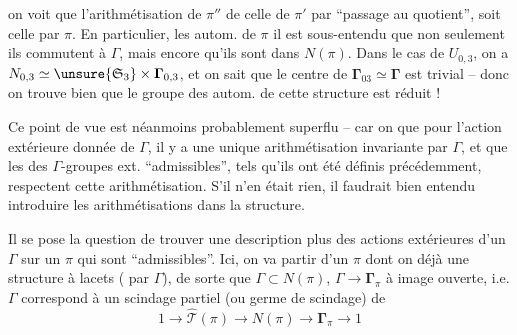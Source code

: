 on voit que l'arithmétisation de $\pi''$  de celle de $\pi'$ par ``passage au quotient'', soit celle  par $\pi$.  En particulier,  les autom. de $\pi$ il est sous-entendu que  non seulement ils commutent à $\Gamma$, mais encore qu'ils sont dans $N(\pi)$.  Dans le cas de $U_{0,3}$, on a $N_{0,3}\simeq\unsure{\mathfrak S_3}\times\boldsymbol{\Gamma}_{0,3}$, et on sait que le centre de $\boldsymbol{\Gamma}_{03}\simeq\boldsymbol{\Gamma}$ est trivial -- donc on trouve bien que le groupe des autom. de cette structure est réduit   !

Ce point de vue est néanmoins probablement superflu -- car on  que pour l'action extérieure donnée de $\Gamma$, il y a une unique arithmétisation invariante par $\Gamma$, et que les   des $\Gamma$-groupes ext. ``admissibles'', tels qu'ils ont été définis précédemment, respectent  cette arithmétisation. S'il n'en était rien, il faudrait bien entendu introduire les arithmétisations dans la structure.



Il se pose la question de trouver une description plus   des actions extérieures d'un $\Gamma$ sur un $\pi$ qui sont ``admissibles''.  Ici, on va partir d'un $\pi$ dont on  déjà une structure à lacets  ( par $\Gamma$), de  sorte que $\Gamma\subset N(\pi)$, $\Gamma\longrightarrow\boldsymbol{\Gamma}_\pi$  à image ouverte,  i.e. $\Gamma$ correspond à un scindage partiel (ou germe de scindage) de 
\[
1\longrightarrow\widehat{\mathcal T}(\pi)\longrightarrow N(\pi)\longrightarrow\boldsymbol{\Gamma}_\pi\longrightarrow1
\]

